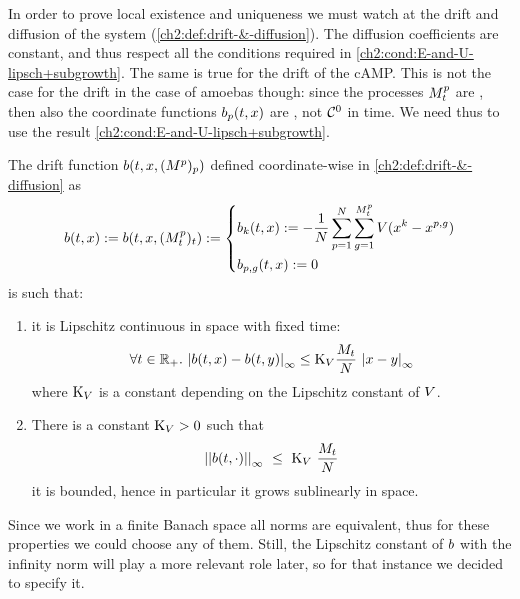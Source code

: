 In order to prove local existence and uniqueness we must watch at the drift and diffusion of the system (\ref{ch2:def:drift-&-diffusion}).
The diffusion coefficients are constant, and thus respect all the conditions required in \ref{ch2:cond:E-and-U-lipsch+subgrowth}.
The same is true for the drift of the cAMP.
This is not the case for the drift in the case of amoebas though: since the processes $M^p_t$ are \cadlag\footnotemark[1], then also the coordinate functions $b_p(t, x)$ are \cadlag, \ie not $\mathcal{C}^0$ in time.
We need thus to use the result \ref{ch2:cond:E-and-U-lipsch+subgrowth}.


\begin{lemma}\label{ch2:lemma:lipsch-of-drift}
The drift function $b(t, x, (M^p)_p)$ defined coordinate-wise in \ref{ch2:def:drift-&-diffusion} as
\begin{equation*}
b(t,x) := b(t,x, (M^p_t)_t) := 
\left\{
\begin{aligned}
&b_k(t,x) := -\frac{1}{N} \sum _{p = 1}^{N} \sum_{g = 1}^{M_t^p} V(x^k - x^{p,g})
\\
&b_{p,g}(t,x) := 0
\end{aligned}
\right.
\end{equation*}
is such that:
\begin{enumerate}
\item it is Lipschitz continuous in space with fixed time:
\begin{equation}
\forall t \in \mathbb{R}_+.\ { \left|  b(t,x) - b(t,y) \right|_{\infty} }
\leq \text{K}_V \frac{M_t}{N}\
{ \left| x-y \right|_{\infty} }
\end{equation}
where $\text{K}_V$ is a constant depending on the Lipschitz constant of $V$.
\item There is a constant $\text{K}_{V}>0$ such that
\begin{equation*}
{ \left| \left|  b(t,\cdot) \right| \right|_{\infty} }\
\leq\
\text{K}_{V}\
\frac{M_t}{N}
\end{equation*}
\ie it is bounded, hence in particular it grows sublinearly in space.
\end{enumerate}
\end{lemma}

\begin{remark}
Since we work in a finite Banach space all norms are equivalent, thus for these properties we could choose any of them.
Still, the Lipschitz constant of $b$ with the infinity norm will play a more relevant role later, so for that instance we decided to specify it.
\end{remark}

